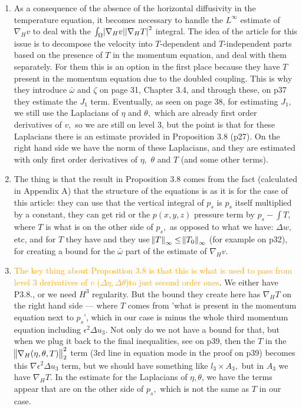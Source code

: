 \documentclass[11pt]{article}
\begin{document}
\begin{enumerate}
\item As a consequence of the absence of the horizontal diffusivity in the temperature equation, it becomes necessary to handle the $L^\infty$ estimate of $\nabla_H v$ to deal with the $\int_\Omega \abs{\nabla _H v} \abs{\nabla_H T}^2$ integral. The idea of the article for this issue is to decompose the velocity into $T$-dependent and $T$-independent parts based on the presence of $T$ in the momentum equation, and deal with them separately. For them this is an option in the first place because they have $T$ present in the momentum equation due to the doubled coupling. This is why they introduce $\bar{\omega}$ and $\zeta$ on page 31, Chapter 3.4, and through these, on p37 they estimate the $J_1$ term. Eventually, as seen on page 38, for estimating $J_1,$ we still use the Laplacians of $\eta$ and $\theta,$ which are already first order derivatives of $v,$ so we are still on level 3, but the point is that for these Laplacians there is an estimate provided in Proposition 3.8 (p27). On the right hand side we have the norm of these Laplacians, and they are estimated with only first order derivatives of $\eta,$ $\theta$ and $T$ (and some other terms).

\item The thing is that the result in Proposition 3.8 comes from the fact (calculated in Appendix A) that the structure of the equations is as it is for the case of this article: they can use that the vertical integral of $p_s$ is $p_s$ itself multiplied by a constant, they can get rid or the $p(x,y,z)$ pressure term by $p_s - \int T$, where $T$ is what is on the other side of $p_s,$ as opposed to what we have: $\Delta w,$ etc, and for $T$ they have and they use $\norm{T}_\infty \leq \norm{T_0}_\infty$ (for example on p32), for creating a bound for the $\bar{\omega}$ part of the estimate of $\nabla_H v.$

\item \textcolor{orange}{The key thing about Proposition 3.8 is that this is what is used to pass from level 3 derivatives of $v$ ($\Delta \eta, \Delta \theta$)to just second order ones}. We either have P3.8., or we need $H^3$ regularity. But the bound they create here has $\nabla_H T$ on the right hand side --- where $T$ comes from 'what is present in the momentum equation next to $p_s$', which in our case is minus the whole third momentum equation including $\epsilon^2 \Delta u_3.$ Not only do we not have a bound for that, but when we plug it back to the final inequalities, see on p39, then the $T$ in the $\norm{\nabla_H (\eta, \theta, T)}_2^2$ term (3rd line in equation mode in the proof on p39) becomes this $\nabla \epsilon^2 \Delta u_3$ term, but we should have something like $l_3 \times A_3,$ but in $A_3$ we have $\nabla_H T.$ In the estimate for the Laplacians of $\eta, \theta$, we have the terms appear that are on the other side of $p_s,$ which is not the same as $T$ in our case.


\end{enumerate}
\end{document}
